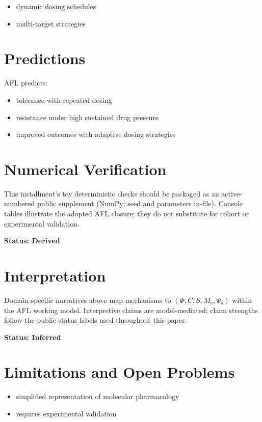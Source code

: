 \documentclass[11pt]{article}
\begin{document}
\begin{itemize}
    \item dynamic dosing schedules
    \item multi-target strategies
\end{itemize}

\section{Predictions}

AFL predicts:

\begin{itemize}
    \item tolerance with repeated dosing
    \item resistance under high sustained drug pressure
    \item improved outcomes with adaptive dosing strategies
\end{itemize}

\section{Numerical Verification}
This installment's toy deterministic checks should be packaged as an active-numbered public supplement (NumPy; seed and parameters in-file). Console tables illustrate the adopted AFL closure; they do not substitute for cohort or experimental validation.

\textbf{Status: Derived}

\section{Interpretation}
Domain-specific narratives above map mechanisms to $(\Phi, C, S, M_s, \Psi_s)$ within the AFL working model. Interpretive claims are model-mediated; claim strengths follow the public status labels used throughout this paper.

\textbf{Status: Inferred}

\section{Limitations and Open Problems}

\begin{itemize}
    \item simplified representation of molecular pharmacology
    \item requires experimental validation
\end{itemize}
\end{document}
